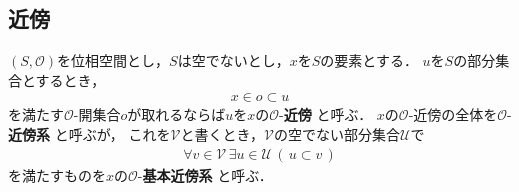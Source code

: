 \subsection{近傍}
	\begin{screen}
		\begin{dfn}[近傍]
			$(S,\mathscr{O})$を位相空間とし，$S$は空でないとし，$x$を$S$の要素とする．
			$u$を$S$の部分集合とするとき，
			\begin{align}
				x \in o \subset u
			\end{align}
			を満たす$\mathscr{O}$-開集合$o$が取れるならば$u$を$x$の$\mathscr{O}$-{\bf 近傍}
			と呼ぶ．
			$x$の$\mathscr{O}$-近傍の全体を$\mathscr{O}$-{\bf 近傍系}
			と呼ぶが，
			これを$\mathscr{V}$と書くとき，$\mathscr{V}$の空でない部分集合$\mathscr{U}$で
			\begin{align}
				\forall v \in \mathscr{V}\, \exists u \in \mathscr{U}\,
				(\, u \subset v\, )
			\end{align}
			を満たすものを$x$の$\mathscr{O}$-{\bf 基本近傍系}
			と呼ぶ．
		\end{dfn}
	\end{screen}
	
